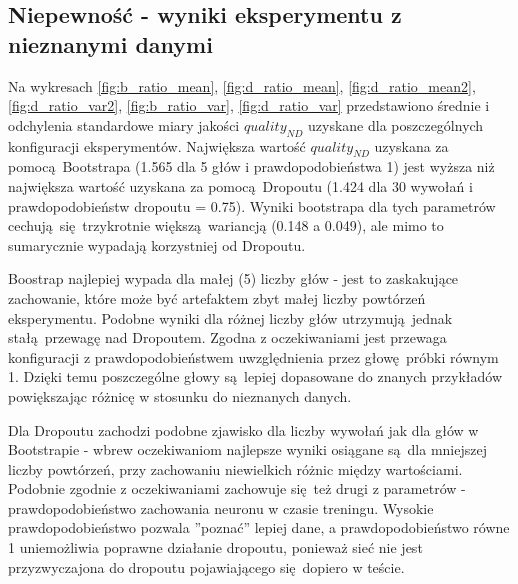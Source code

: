 \subsection{Niepewność - wyniki eksperymentu z nieznanymi danymi}

Na wykresach \ref{fig:b_ratio_mean}, \ref{fig:d_ratio_mean}, \ref{fig:d_ratio_mean2}, \ref{fig:d_ratio_var2}, \ref{fig:b_ratio_var}, \ref{fig:d_ratio_var} przedstawiono średnie i odchylenia standardowe miary jakości $quality_{ND}$ uzyskane dla poszczególnych konfiguracji eksperymentów. Największa wartość $quality_{ND}$ uzyskana za pomocą Bootstrapa (1.565 dla 5 głów i prawdopodobieństwa 1) jest wyższa niż największa wartość uzyskana za pomocą Dropoutu (1.424 dla 30 wywołań i prawdopodobieństw dropoutu = 0.75). Wyniki bootstrapa dla tych parametrów cechują się trzykrotnie większą wariancją (0.148 a 0.049), ale mimo to sumarycznie wypadają korzystniej od Dropoutu.

Boostrap najlepiej wypada dla małej (5) liczby głów - jest to zaskakujące zachowanie, które może być artefaktem zbyt małej liczby powtórzeń eksperymentu. Podobne wyniki dla różnej liczby głów utrzymują jednak stałą przewagę nad Dropoutem. Zgodna z oczekiwaniami jest przewaga konfiguracji z prawdopodobieństwem uwzględnienia przez głowę próbki równym 1. Dzięki temu poszczególne głowy są lepiej dopasowane do znanych przykładów powiększając różnicę w stosunku do nieznanych danych.

Dla Dropoutu zachodzi podobne zjawisko dla liczby wywołań jak dla głów w Bootstrapie - wbrew oczekiwaniom najlepsze wyniki osiągane są dla mniejszej liczby powtórzeń, przy zachowaniu niewielkich różnic między wartościami. Podobnie zgodnie z oczekiwaniami zachowuje się też drugi z parametrów - prawdopodobieństwo zachowania neuronu w czasie treningu. Wysokie prawdopodobieństwo pozwala ''poznać'' lepiej dane, a prawdopodobieństwo równe 1 uniemożliwia poprawne działanie dropoutu, ponieważ sieć nie jest przyzwyczajona do dropoutu pojawiającego się dopiero w teście.

